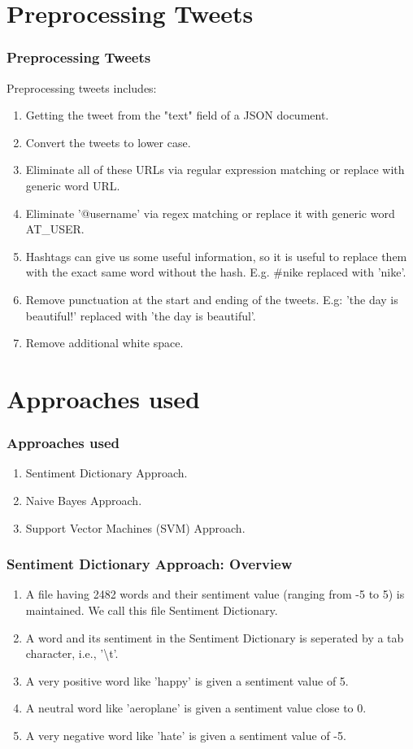 \documentclass[12pt,xcolor=dvipsnames,table,titlepage]{beamer}
\begin{document}
\section{Preprocessing Tweets}
\begin{frame}[t]
\frametitle{Preprocessing Tweets}
Preprocessing tweets includes:
\begin{enumerate}
\item Getting the tweet from the "text" field of a JSON document.
\item Convert the tweets to lower case.
\item Eliminate all of these URLs via regular expression matching or replace with generic word URL.
\item Eliminate '@username' via regex matching or replace it with generic word AT\_USER.
\item Hashtags can give us some useful information, so it is useful to replace them with the exact same word without the hash. E.g. \#nike replaced with 'nike'.
\item Remove punctuation at the start and ending of the tweets. E.g: 'the day is beautiful!' replaced with 'the day is beautiful'.
\item Remove additional white space.
\end{enumerate}
\end{frame}

\section{Approaches used}
\begin{frame}[t]
\frametitle{Approaches used}
\begin{enumerate}
\item Sentiment Dictionary Approach.
\item Naive Bayes Approach.
\item Support Vector Machines (SVM) Approach.
\end{enumerate}
\end{frame}

\begin{frame}[t]
\frametitle{Sentiment Dictionary Approach: Overview}
\begin{enumerate}
\item A file having 2482 words and their sentiment value (ranging from -5 to 5) is maintained. We call this file Sentiment Dictionary. \cite{sentimentdictionary}
\item A word and its sentiment in the Sentiment Dictionary is seperated by a tab character, i.e., '\textbackslash t'.
\item A very positive word like 'happy' is given a sentiment value of 5.
\item A neutral word like 'aeroplane' is given a sentiment value close to 0.
\item A very negative word like 'hate' is given a sentiment value of -5.
\end{enumerate}
\end{frame}
\end{document}
